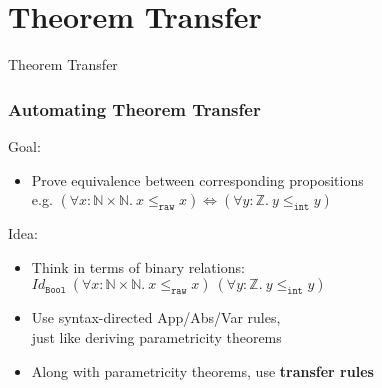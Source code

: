 \documentclass[english]{beamer}
\begin{document}
\section{Theorem Transfer}
\begin{frame}
\begin{center}
\huge{Theorem Transfer}
\end{center}
\end{frame}

\begin{frame}
\frametitle{Automating Theorem Transfer}
Goal:
\begin{itemize}
\item Prove equivalence between corresponding propositions \\
e.g. $(\forall x : \mathbb{N} \times \mathbb{N}.\: x \le_\mathtt{raw} x) \Leftrightarrow (\forall y : \mathbb{Z}.\: y \le_\mathtt{int} y)$
\end{itemize}
\bigskip
\pause
Idea:
\begin{itemize}[<+->]
\item Think in terms of binary relations:\\
$\mathit{Id}_\mathtt{Bool}\:(\forall x : \mathbb{N} \times \mathbb{N}.\: x \le_\mathtt{raw} x)\:(\forall y : \mathbb{Z}.\: y \le_\mathtt{int} y)$
\item Use syntax-directed App/Abs/Var rules,\\
just like deriving parametricity theorems
\item Along with parametricity theorems, use \textbf{transfer rules}
\end{itemize}
\end{frame}
\end{document}

